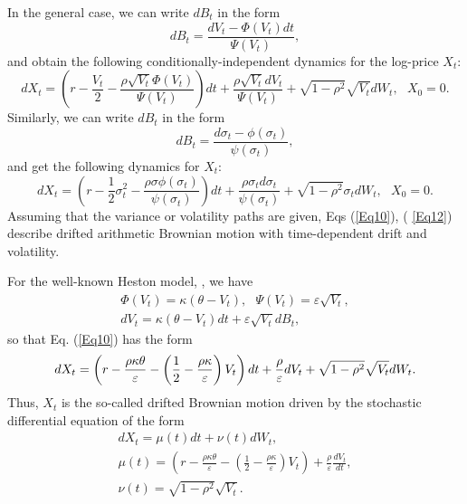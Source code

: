 \documentclass{article}
\begin{document}
In the general case, we can write $dB_{t}$ in the form%
\begin{equation}
dB_{t}=\frac{dV_{t}-\Phi \left( V_{t}\right) dt}{\Psi \left( V_{t}\right) },
\label{Eq9}
\end{equation}%
and obtain the following conditionally-independent dynamics for the
log-price $X_{t}$:%
\begin{equation}
dX_{t}=\left( r-\frac{V_{t}}{2}-\frac{\rho \sqrt{V_{t}}\Phi \left(
V_{t}\right) }{\Psi \left( V_{t}\right) }\right) dt+\frac{\rho \sqrt{V_{t}}%
dV_{t}}{\Psi \left( V_{t}\right) }+\sqrt{1-\rho ^{2}}\sqrt{V_{t}}dW_{t},\ \
\ X_{0}=0.  \label{Eq10}
\end{equation}%
Similarly, we can write $dB_{t}$ in the form%
\begin{equation}
dB_{t}=\frac{d\sigma _{t}-\phi \left( \sigma _{t}\right) }{\psi \left(
\sigma _{t}\right) },  \label{Eq11}
\end{equation}%
and get the following dynamics for $X_{t}$:%
\begin{equation}
dX_{t}=\left( r-\frac{1}{2}\sigma _{t}^{2}-\frac{\rho \sigma \phi \left(
\sigma _{t}\right) }{\psi \left( \sigma _{t}\right) }\right) dt+\frac{\rho
\sigma _{t}d\sigma _{t}}{\psi \left( \sigma _{t}\right) }+\sqrt{1-\rho ^{2}}%
\sigma _{t}dW_{t},\ \ \ X_{0}=0.  \label{Eq12}
\end{equation}%
Assuming that the variance or volatility paths are given, Eqs (\ref{Eq10}), (%
\ref{Eq12}) describe drifted arithmetic Brownian motion with time-dependent
drift and volatility.

For the well-known Heston model, \cite{Heston1993}, we have%
\begin{equation}
\begin{array}{c}
\Phi \left( V_{t}\right) =\kappa \left( \theta -V_{t}\right) ,\ \ \ \Psi
\left( V_{t}\right) =\varepsilon \sqrt{V_{t}}, \\ 
dV_{t}=\kappa \left( \theta -V_{t}\right) dt+\varepsilon \sqrt{V_{t}}dB_{t},%
\end{array}
\label{Eq13}
\end{equation}%
so that Eq. (\ref{Eq10}) has the form%
\begin{equation}
dX_{t}=\left( r-\frac{\rho \kappa \theta }{\varepsilon }-\left( \frac{1}{2}-%
\frac{\rho \kappa }{\varepsilon }\right) V_{t}\right) dt+\frac{\rho }{%
\varepsilon }dV_{t}+\sqrt{1-\rho ^{2}}\sqrt{V_{t}}dW_{t}.  \label{Eq15}
\end{equation}%
Thus, $X_{t}$ is the so-called drifted Brownian motion driven by the
stochastic differential equation of the form%
\begin{equation}
\begin{array}{c}
dX_{t}=\mu \left( t\right) dt+\nu \left( t\right) dW_{t}, \\ 
\mu \left( t\right) =\left( r-\frac{\rho \kappa \theta }{\varepsilon }%
-\left( \frac{1}{2}-\frac{\rho \kappa }{\varepsilon }\right) V_{t}\right) +%
\frac{\rho }{\varepsilon }\frac{dV_{t}}{dt}, \\ 
\nu \left( t\right) =\sqrt{1-\rho ^{2}}\sqrt{V_{t}}.%
\end{array}
\label{Eq15a}
\end{equation}
\end{document}
